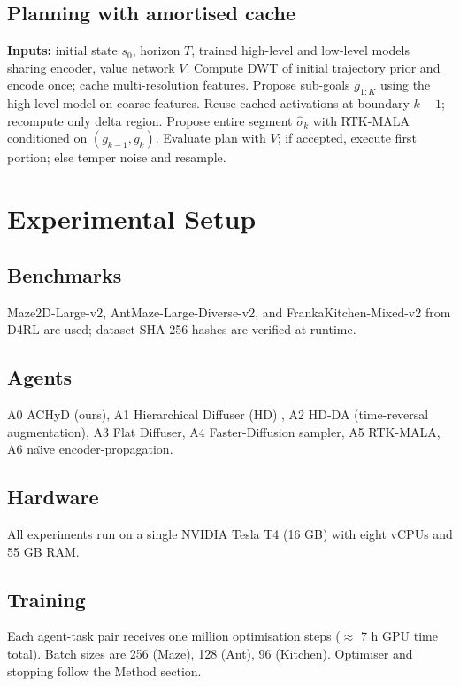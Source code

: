 \documentclass{article}
\begin{document}
\subsection{Planning with amortised cache}
\begin{algorithm}[H]
\caption{ACHyD planning loop}
\begin{algorithmic}[1]
\State \textbf{Inputs:} initial state $s_0$, horizon $T$, trained high-level and low-level models sharing encoder, value network $V$.
\State Compute DWT of initial trajectory prior and encode once; cache multi-resolution features.
  \State Propose sub-goals $g_{1:K}$ using the high-level model on coarse features.
    \State Reuse cached activations at boundary $k-1$; recompute only delta region.
    \State Propose entire segment $\hat{\sigma}_k$ with RTK-MALA conditioned on $(g_{k-1}, g_k)$.
  \EndFor
  \State Evaluate plan with $V$; if accepted, execute first portion; else temper noise and resample.
\EndFor
\end{algorithmic}
\end{algorithm}

\section{Experimental Setup}
\subsection{Benchmarks}
Maze2D-Large-v2, AntMaze-Large-Diverse-v2, and FrankaKitchen-Mixed-v2 from D4RL are used; dataset SHA-256 hashes are verified at runtime.

\subsection{Agents}
A0 ACHyD (ours), A1 Hierarchical Diffuser (HD) \cite{chen-2024-simple}, A2 HD-DA (time-reversal augmentation), A3 Flat Diffuser, A4 Faster-Diffusion sampler, A5 RTK-MALA, A6 na\"\i ve encoder-propagation.

\subsection{Hardware}
All experiments run on a single NVIDIA Tesla T4 (16 GB) with eight vCPUs and 55 GB RAM.

\subsection{Training}
Each agent-task pair receives one million optimisation steps ($\approx$ 7 h GPU time total). Batch sizes are 256 (Maze), 128 (Ant), 96 (Kitchen). Optimiser and stopping follow the Method section.
\end{document}

